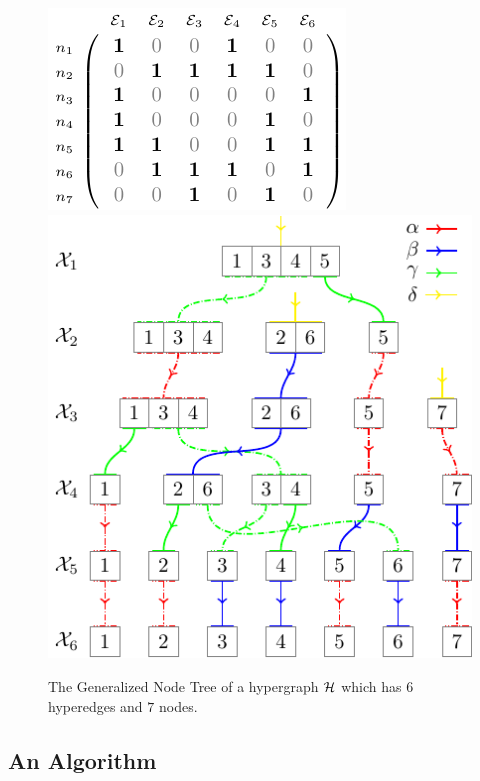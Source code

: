 \documentclass[aps, 10pt, english, twoside, twocolumn, pra, nofootinbib, tightenlines, longbibliography, superscriptaddress]{revtex4-1}
\begin{document}
    \begin{figure}
        \includegraphics[width=\linewidth]{figures/hypergraph_matrix_2_standalone/figure.pdf}
        \includegraphics[width=\linewidth]{figures/generalized_node_tree_2/figure.pdf}
        \caption{The Generalized Node Tree of a hypergraph $\mathcal{H}$ which has $6$ hyperedges and $7$ nodes.}
    \end{figure}


    \subsection{An Algorithm}
    \label{sec:algorithm_section}
\end{document}
